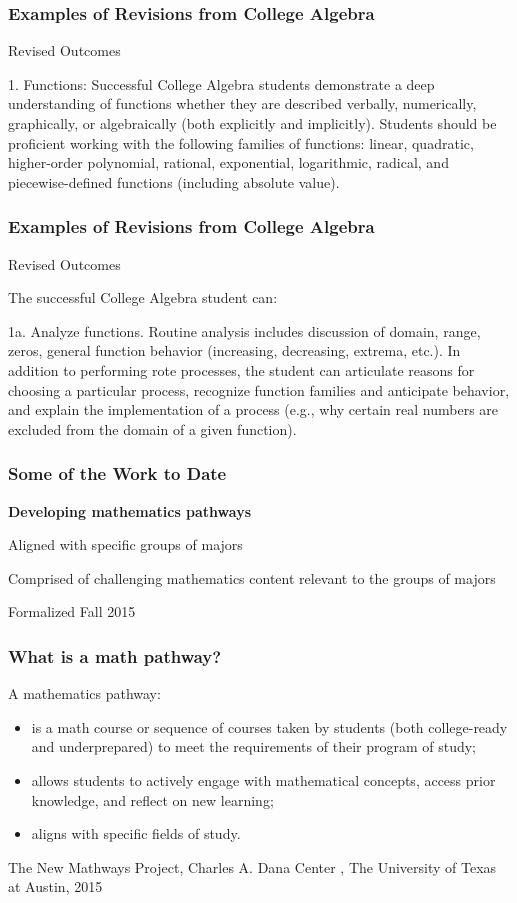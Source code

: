 \documentclass[13pt]{beamer}
\newcounter{a}
\newcounter{b}
\begin{document}
\begin{frame}
  \frametitle{Examples of Revisions from College Algebra}

  Revised Outcomes

1. Functions: Successful College Algebra students demonstrate a deep understanding of functions whether they are described verbally, numerically, graphically, or algebraically (both explicitly and implicitly).  Students should be proficient working with the following families of functions:  linear, quadratic, higher-order polynomial, rational, exponential, logarithmic, radical, and piecewise-defined functions (including absolute value).    

\end{frame}

\begin{frame}
  \frametitle{Examples of Revisions from College Algebra}

  Revised Outcomes

The successful College Algebra student can: 
 
1a. Analyze functions.  Routine analysis includes discussion of domain, range, zeros, general function behavior (increasing, decreasing, extrema, etc.).  In addition to performing rote processes, the student can articulate reasons for choosing a particular process, recognize function families and anticipate behavior, and explain the implementation of a process (e.g., why certain real numbers are excluded from the domain of a given function).
  
\end{frame}

\begin{frame}
  \frametitle{Some of the Work to Date}
\textbf{Developing mathematics pathways}

Aligned with specific groups of majors

Comprised of challenging mathematics content relevant to the groups of majors

Formalized Fall 2015
\end{frame}

\begin{frame}
  \frametitle{What is a math pathway?}

  A mathematics pathway:
\begin{itemize}
  \item is a math course or sequence of courses taken by students (both college-ready and underprepared) to meet the requirements of their program of study;
  \item allows students to actively engage with mathematical concepts, access prior knowledge, and reflect on new learning;
  \item aligns with specific fields of study.
\end{itemize}

The New Mathways Project, Charles A. Dana Center , The University of Texas at Austin, 2015
\end{frame}
\end{document}
